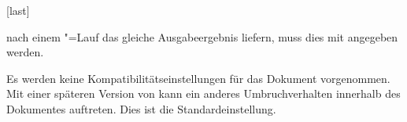 \begin{Declaration*}{}
\begin{Declaration*}{}
\begin{Declaration*}{}
\begin{Declaration}[v2.03]{}[last]
\begin{values}{}
  \TUDScript nach einem "=Lauf das gleiche Ausgabeergebnis 
  liefern, muss dies mit  angegeben werden.
\item[\PValue{last}]
  Es werden keine Kompatibilitätseinstellungen für das Dokument vorgenommen. 
  Mit einer späteren Version von \TUDScript kann ein anderes Umbruchverhalten 
  innerhalb des Dokumentes auftreten. Dies ist die Standardeinstellung.
\end{values}
\end{Declaration}
\end{Declaration*}
\end{Declaration*}
\end{Declaration*}
